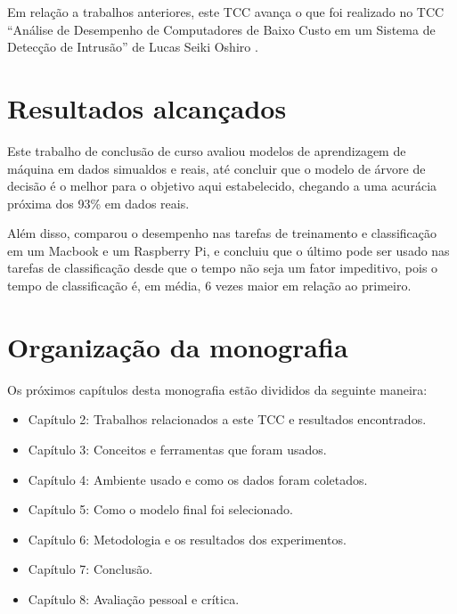 Em relação a trabalhos anteriores, este TCC avança o que foi realizado no TCC “Análise de Desempenho de Computadores de Baixo Custo em um Sistema de 
Detecção de Intrusão” de Lucas Seiki Oshiro \cite{tcc:lucas}.

\section{Resultados alcançados}

Este trabalho de conclusão de curso avaliou modelos de aprendizagem de máquina em dados simualdos e 
reais, até concluir que o modelo de árvore de decisão é o melhor para o objetivo aqui estabelecido, 
chegando a uma acurácia próxima dos 93\% em dados reais.

Além disso, comparou o desempenho nas tarefas de treinamento e classificação em um Macbook e um 
Raspberry Pi, e concluiu que o último pode ser usado nas tarefas de classificação desde que o tempo
não seja um fator impeditivo, pois o tempo de classificação é, em média, 6 vezes maior em relação ao primeiro.

\section{Organização da monografia}

Os próximos capítulos desta monografia estão divididos da seguinte maneira: 

\begin{itemize}
    \item Capítulo 2: Trabalhos relacionados a este TCC e resultados encontrados.
    \item Capítulo 3: Conceitos e ferramentas que foram usados.
    \item Capítulo 4: Ambiente usado e como os dados foram coletados.
    \item Capítulo 5: Como o modelo final foi selecionado.
    \item Capítulo 6: Metodologia e os resultados dos experimentos.
    \item Capítulo 7: Conclusão.
    \item Capítulo 8: Avaliação pessoal e crítica.
\end{itemize}